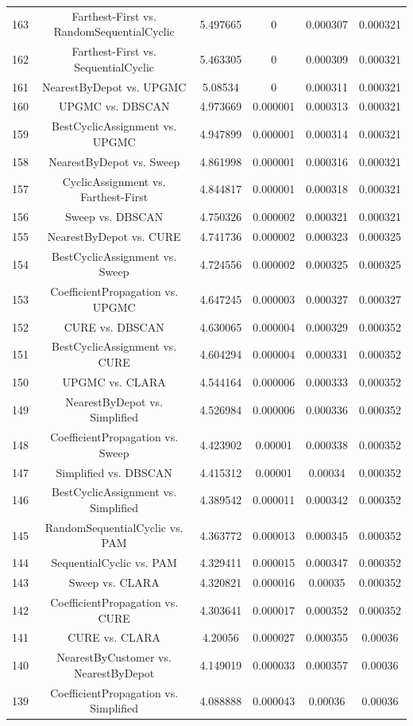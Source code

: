 \documentclass[a4paper,10pt]{article}
\begin{document}
\begin{landscape}
\begin{table}[!htp]
\begin{tabular}{cccccc}
163&Farthest-First vs. RandomSequentialCyclic&5.497665&0&0.000307&0.000321\\
162&Farthest-First vs. SequentialCyclic&5.463305&0&0.000309&0.000321\\
161&NearestByDepot vs. UPGMC&5.08534&0&0.000311&0.000321\\
160&UPGMC vs. DBSCAN&4.973669&0.000001&0.000313&0.000321\\
159&BestCyclicAssignment vs. UPGMC&4.947899&0.000001&0.000314&0.000321\\
158&NearestByDepot vs. Sweep&4.861998&0.000001&0.000316&0.000321\\
157&CyclicAssignment vs. Farthest-First&4.844817&0.000001&0.000318&0.000321\\
156&Sweep vs. DBSCAN&4.750326&0.000002&0.000321&0.000321\\
155&NearestByDepot vs. CURE&4.741736&0.000002&0.000323&0.000325\\
154&BestCyclicAssignment vs. Sweep&4.724556&0.000002&0.000325&0.000325\\
153&CoefficientPropagation vs. UPGMC&4.647245&0.000003&0.000327&0.000327\\
152&CURE vs. DBSCAN&4.630065&0.000004&0.000329&0.000352\\
151&BestCyclicAssignment vs. CURE&4.604294&0.000004&0.000331&0.000352\\
150&UPGMC vs. CLARA&4.544164&0.000006&0.000333&0.000352\\
149&NearestByDepot vs. Simplified&4.526984&0.000006&0.000336&0.000352\\
148&CoefficientPropagation vs. Sweep&4.423902&0.00001&0.000338&0.000352\\
147&Simplified vs. DBSCAN&4.415312&0.00001&0.00034&0.000352\\
146&BestCyclicAssignment vs. Simplified&4.389542&0.000011&0.000342&0.000352\\
145&RandomSequentialCyclic vs. PAM&4.363772&0.000013&0.000345&0.000352\\
144&SequentialCyclic vs. PAM&4.329411&0.000015&0.000347&0.000352\\
143&Sweep vs. CLARA&4.320821&0.000016&0.00035&0.000352\\
142&CoefficientPropagation vs. CURE&4.303641&0.000017&0.000352&0.000352\\
141&CURE vs. CLARA&4.20056&0.000027&0.000355&0.00036\\
140&NearestByCustomer vs. NearestByDepot&4.149019&0.000033&0.000357&0.00036\\
139&CoefficientPropagation vs. Simplified&4.088888&0.000043&0.00036&0.00036\\

\end{tabular}
\end{table}
\end{landscape}
\end{document}
